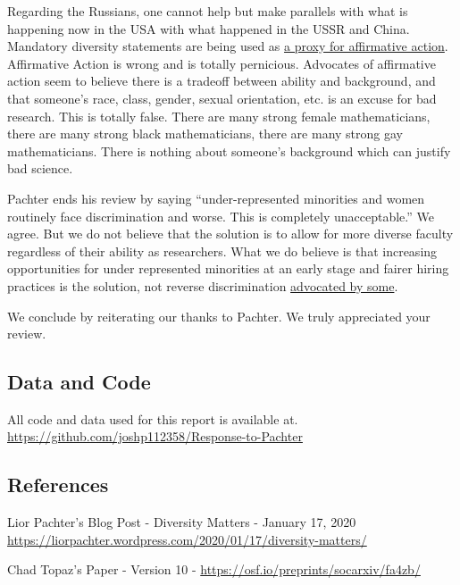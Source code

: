 \documentclass[]{article}
\begin{document}
Regarding the Russians, one cannot help but make parallels with what is
happening now in the USA with what happened in the USSR and China.
Mandatory diversity statements are being used as
\href{https://whyevolutionistrue.wordpress.com/2019/12/31/life-science-jobs-at-berkeley-with-hiring-giving-precedence-to-diversity-and-inclusion-statements/?fbclid=IwAR1tnpRsEfr43Y4b47EtScpSH_sUdhuqcfjBmi0Ez0uhxrK-aW4lR4C9sfg}{a
proxy for affirmative action}. Affirmative Action is wrong and is
totally pernicious. Advocates of affirmative action seem to believe
there is a tradeoff between ability and background, and that someone's
race, class, gender, sexual orientation, etc. is an excuse for bad
research. This is totally false. There are many strong female
mathematicians, there are many strong black mathematicians, there are
many strong gay mathematicians. There is nothing about someone's
background which can justify bad science.

Pachter ends his review by saying ``under-represented minorities and
women routinely face discrimination and worse. This is completely
unacceptable.'' We agree. But we do not believe that the solution is to
allow for more diverse faculty regardless of their ability as
researchers. What we do believe is that increasing opportunities for
under represented minorities at an early stage and fairer hiring
practices is the solution, not reverse discrimination
\href{https://blogs.ams.org/inclusionexclusion/2017/05/11/get-out-the-way/}{advocated
by some}.

We conclude by reiterating our thanks to Pachter. We truly appreciated
your review.

\hypertarget{data-and-code}{%
\subsection{Data and Code}\label{data-and-code}}

All code and data used for this report is available at.
\url{https://github.com/joshp112358/Response-to-Pachter}

\hypertarget{references}{%
\subsection{References}\label{references}}

Lior Pachter's Blog Post - Diversity Matters - January 17, 2020
\url{https://liorpachter.wordpress.com/2020/01/17/diversity-matters/}

Chad Topaz's Paper - Version 10 -
\url{https://osf.io/preprints/socarxiv/fa4zb/}
\end{document}
